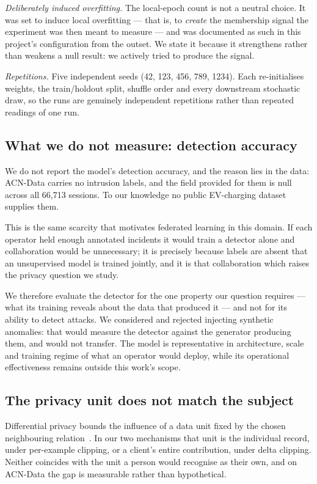 \emph{Deliberately induced overfitting.} The local-epoch count is not a neutral
choice. It was set to induce local overfitting --- that is, to \emph{create}
the membership signal the experiment was then meant to measure --- and was
documented as such in this project's configuration from the outset. We state it
because it strengthens rather than weakens a null result: we actively tried to
produce the signal.

\emph{Repetitions.} Five independent seeds (42, 123, 456, 789, 1234). Each
re-initialises weights, the train/holdout split, shuffle order and every
downstream stochastic draw, so the runs are genuinely independent repetitions
rather than repeated readings of one run.

\subsection{What we do not measure: detection accuracy}
\label{sec:setup-notmeasured}

We do not report the model's detection accuracy, and the reason lies in the
data: ACN-Data carries no intrusion labels, and the field provided for them is
null across all 66{,}713 sessions. To our knowledge no public EV-charging
dataset supplies them.

This is the same scarcity that motivates federated learning in this domain. If
each operator held enough annotated incidents it would train a detector alone
and collaboration would be unnecessary; it is precisely because labels are
absent that an unsupervised model is trained jointly, and it is that
collaboration which raises the privacy question we study.

We therefore evaluate the detector for the one property our question requires
--- what its training reveals about the data that produced it --- and not for
its ability to detect attacks. We considered and rejected injecting synthetic
anomalies: that would measure the detector against the generator producing
them, and would not transfer. The model is representative in architecture,
scale and training regime of what an operator would deploy, while its
operational effectiveness remains outside this work's scope.

\subsection{The privacy unit does not match the subject}
\label{sec:setup-privacyunit}

Differential privacy bounds the influence of a data unit fixed by the chosen
neighbouring relation~\cite{dwork2006calibrating}. In our two mechanisms that
unit is the individual record, under per-example clipping, or a client's entire
contribution, under delta clipping. Neither coincides with the unit a person
would recognise as their own, and on ACN-Data the gap is measurable rather than
hypothetical.

